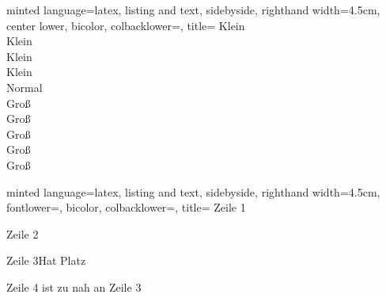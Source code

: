 \documentclass[
    ngerman,
    accentcolor=3b,
    dark_mode,
    fontsize= 12pt,
    a4paper,
    aspectratio=169,
    colorback=true,
    fancy_row_colors,
    leqno,
    fleqn,
    boxarc=3pt,
    fleqn,
]{algoslides}
\begin{document}
    \begin{frame}[c, fragile]
        \begin{codeBlock}[]{
            minted language=latex,
            listing and text,
            sidebyside,
            righthand width=4.5cm,
            center lower,
            bicolor,
            colbacklower=,
            title=
            }
            \tiny{Klein}\\
            \scriptsize{Klein}\\
            \footnotesize{Klein}\\
            \small{Klein}\\
            \normalsize{Normal}\\
            \large{Groß}\\
            \Large{Groß}\\
            \LARGE{Groß}\\
            \huge{Groß}\\
            \Huge{Groß}
        \end{codeBlock}
    \end{frame}

    \begin{frame}[c, fragile]
        \slidehead{}
        \begin{codeBlock}[]{
            minted language=latex,
            listing and text,
            sidebyside,
            righthand width=4.5cm,
            fontlower=\setlength{\parskip}{\medskipamount}\setlength{\parindent}{0em},
            bicolor,
            colbacklower=,
            title=
            }
            Zeile 1

            Zeile 2

            \vspace{1cm}
            Zeile 3\hspace{1cm}Hat Platz

            \vspace{-4mm}
            Zeile 4 ist zu nah an Zeile 3
        \end{codeBlock}
    \end{frame}
\end{document}
